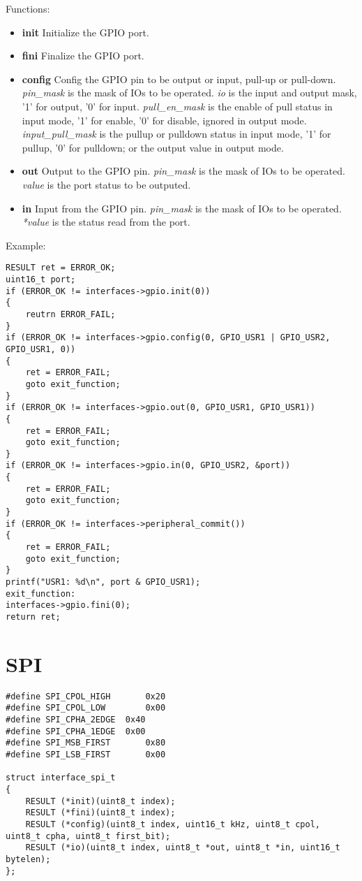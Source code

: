 \documentclass[a4paper,12pt]{book}
\begin{document}
\vspace{6pt}
Functions:
\begin{itemize}
\item \textbf{init}
Initialize the GPIO port.
\item \textbf{fini}
Finalize the GPIO port.
\item \textbf{config}
Config the GPIO pin to be output or input, pull-up or pull-down.
\newline\emph{pin\_mask} is the mask of IOs to be operated.
\newline\emph{io} is the input and output mask, '1' for output, '0' for input.
\newline\emph{pull\_en\_mask} is the enable of pull status in input mode, '1' for enable, '0' for disable, ignored in output mode.
\newline\emph{input\_pull\_mask} is the pullup or pulldown status in input mode, '1' for pullup, '0' for pulldown; or the output value in output mode.
\item \textbf{out}
Output to the GPIO pin.
\newline\emph{pin\_mask} is the mask of IOs to be operated.
\newline\emph{value} is the port status to be outputed.
\item \textbf{in}
Input from the GPIO pin.
\newline\emph{pin\_mask} is the mask of IOs to be operated.
\newline\emph{*value} is the status read from the port.
\end{itemize}

\vspace{6pt}
Example:
\begin{lstlisting}
RESULT ret = ERROR_OK;
uint16_t port;
if (ERROR_OK != interfaces->gpio.init(0))
{
	reutrn ERROR_FAIL;
}
if (ERROR_OK != interfaces->gpio.config(0, GPIO_USR1 | GPIO_USR2, GPIO_USR1, 0))
{
	ret = ERROR_FAIL;
	goto exit_function;
}
if (ERROR_OK != interfaces->gpio.out(0, GPIO_USR1, GPIO_USR1))
{
	ret = ERROR_FAIL;
	goto exit_function;
}
if (ERROR_OK != interfaces->gpio.in(0, GPIO_USR2, &port))
{
	ret = ERROR_FAIL;
	goto exit_function;
}
if (ERROR_OK != interfaces->peripheral_commit())
{
	ret = ERROR_FAIL;
	goto exit_function;
}
printf("USR1: %d\n", port & GPIO_USR1);
exit_function:
interfaces->gpio.fini(0);
return ret;
\end{lstlisting}

\newpage
\section{SPI}
\begin{lstlisting}
#define SPI_CPOL_HIGH		0x20
#define SPI_CPOL_LOW		0x00
#define SPI_CPHA_2EDGE	0x40
#define SPI_CPHA_1EDGE	0x00
#define SPI_MSB_FIRST		0x80
#define SPI_LSB_FIRST		0x00

struct interface_spi_t
{
	RESULT (*init)(uint8_t index);
	RESULT (*fini)(uint8_t index);
	RESULT (*config)(uint8_t index, uint16_t kHz, uint8_t cpol, uint8_t cpha, uint8_t first_bit);
	RESULT (*io)(uint8_t index, uint8_t *out, uint8_t *in, uint16_t bytelen);
};
\end{lstlisting}
\end{document}
